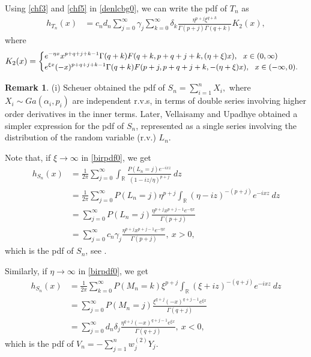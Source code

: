 \documentclass[12pt, a4paper,reqno]{amsart}
\theoremstyle{definition}
\theoremstyle{myremark}
\newtheorem{rem}[thm]{Remark}
\numberwithin{equation}{section}
\begin{document}
\noindent
Using \eqref{chf3} and \eqref{chf5} in \eqref{denlcbg0}, we can write the pdf of $T_n$ as
\begin{align}
 h_{T_{n}}(x)&=c_nd_n\sum_{j=0}^{\infty}\gamma_j\sum_{k=0}^{\infty}\delta_k\frac{\eta^{p+j} \xi^{q+k}}{\Gamma (p+j) \Gamma (q+k)} K_2(x),
\end{align}
where
\begin{align}
	K_2(x)= \small{\begin{cases}
			e^{-\eta x}x^{p+q+j+k-1}\Gamma(q+k)F(q+k,p+q+j+k, (\eta+\xi)x),  ~~x\in(0,\infty)\\
			e^{\xi x}(-x)^{p+q+j+k-1}\Gamma(q+k)F(p+j,p+q+j+k, -(\eta+\xi)x),  ~~x\in(-\infty,0).
	\end{cases}}
\end{align}


\vspace{-.5cm}
\begin{rem}
(i) Scheuer \cite{sch1988} obtained the pdf of $S_n=\sum_{i=1}^{n}X_i,$ where $X_i \sim Ga (\alpha_i,p_i)$ are independent r.v.s, in terms of double series involving higher order derivatives in the inner terms. Later, Vellaisamy and Upadhye \cite[Equation 4.4]{pvns2009} obtained a  simpler expression for the pdf of $S_n$, represented as a single series involving the distribution of the random variable (r.v.) $L_n$. 

\item[(ii)] Note that, if $\xi \to \infty$ in \eqref{birpdf0}, we get 
\begin{align}\label{denlcg}
\nonumber h_{S_n}(x)&=\frac{1}{2\pi}\sum_{j=0}^{\infty}\int_{\mathbb{R}}\frac{P(L_n=j) e^{-ixz}}{(1 -iz/\eta)^{p+j} }~dz\\
\nonumber &=\frac{1}{2\pi}\sum_{j=0}^{\infty}P(L_n=j)\eta^{p+j}\int_{\mathbb{R}}(\eta-iz)^{-(p+j)} e^{-ixz}~dz\\
\nonumber &=\sum_{j=0}^{\infty}P(L_n=j)\frac{\eta^{p+j} x^{p+j-1}e^{-\eta x} }{\Gamma (p+j)}\\
&=\sum_{j=0}^{\infty}c_n\gamma_j\frac{\eta^{p+j} x^{p+j-1}e^{-\eta x} }{\Gamma (p+j)},~x>0,
\end{align}
\noindent
which is the pdf of $S_n$, see \cite[Equation 4.4]{pvns2009}.
\item[(iii)] Similarly, if $\eta \to \infty$ in \eqref{birpdf0}, we get 
\begin{align*}
h_{S_n}(x)
&=\frac{1}{2\pi}\sum_{k=0}^{\infty}P(M_n=k)\xi^{p+j}\int_{\mathbb{R}}(\xi+iz)^{-(q+j)} e^{-ixz}~dz\\
&=\sum_{j=0}^{\infty}P(M_n=j)\frac{\xi^{q+j} (-x)^{q+j-1}e^{\xi x} }{\Gamma (q+j)}\\
&=\sum_{j=0}^{\infty}d_n\delta_j\frac{\eta^{q+j} (-x)^{q+j-1}e^{\xi x} }{\Gamma (q+j)},~x<0,
\end{align*}
\noindent
which is the pdf of $V_n=-\sum_{j=1}^{n}w_j^{(2)}Y_j$.

\end{rem}
\vspace{-.4cm}
\end{document}
